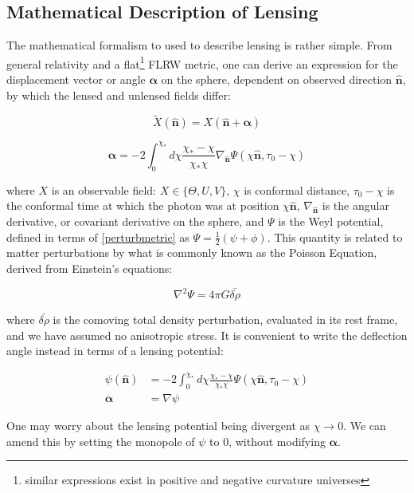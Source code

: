 \documentclass[a4paper,11pt]{article}
\renewcommand{\v}[1]{\mathbf{#1}}
\newcommand{\half}{\frac{1}{2}}
\newcommand{\unit}[1]{\hat{\v{#1}}}
\begin{document}
\subsection{Mathematical Description of Lensing}

The mathematical formalism to used to describe lensing is rather simple. From general relativity and a flat\footnote{similar expressions exist in positive and negative curvature universes} FLRW metric, one can derive an expression for the displacement vector or angle $\v{\alpha}$ on the sphere, dependent on observed direction $\unit{n}$, by which the lensed and unlensed fields differ:

\begin{equation}
\tilde{X}(\unit{n}) = X(\unit{n}+\v{\alpha})
\end{equation}

\begin{equation}
\v{\alpha} = -2 \int_0^{\chi_*}d\chi \frac{\chi_*-\chi}{\chi_*\chi}\nabla_{\unit{n}}\Psi(\chi\unit{n},\tau_0-\chi)
\end{equation}

where $X$ is an observable field: $X \in \{ \Theta, U, V\}$, $\chi$ is conformal distance, $\tau_0-\chi$ is the conformal time at which the photon was at position $\chi\unit{n}$, $\nabla_{\unit{n}}$ is the angular derivative, or covariant derivative on the sphere, and $\Psi$ is the Weyl potential, defined in terms of \ref{perturbmetric} as $\Psi =\half (\psi+\phi)$. This quantity is related to matter perturbations by what is commonly known as the Poisson Equation, derived from Einstein's equations:

\begin{equation}
\nabla^2\Psi = 4\pi G\bar{\delta\rho}
\end{equation}

where $\bar{\delta\rho}$ is the comoving total density perturbation, evaluated in its rest frame, and we have assumed no anisotropic stress. It is convenient to write the deflection angle instead in terms of a lensing potential:

\begin{align}
\psi(\unit{n}) &= -2 \int_0^{\chi_*}d\chi \frac{\chi_*-\chi}{\chi_*\chi}\Psi(\chi\unit{n},\tau_0-\chi)\\
\v{\alpha} &= \nabla \psi
\end{align}

One may worry about the lensing potential being divergent as $\chi \rightarrow 0$. We can amend this by setting the monopole of $\psi$ to 0, without modifying $\v{\alpha}$. 
\end{document}
